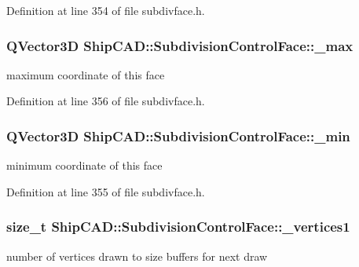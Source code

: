 Definition at line 354 of file subdivface.\+h.

\subsubsection[{\texorpdfstring{\+\_\+max}{_max}}]{\setlength{\rightskip}{0pt plus 5cm}Q\+Vector3D Ship\+C\+A\+D\+::\+Subdivision\+Control\+Face\+::\+\_\+max\hspace{0.3cm}{\ttfamily [protected]}}\hypertarget{classShipCAD_1_1SubdivisionControlFace_a22411574593283209772872bc740535b}{}\label{classShipCAD_1_1SubdivisionControlFace_a22411574593283209772872bc740535b}
maximum coordinate of this face 

Definition at line 356 of file subdivface.\+h.

\subsubsection[{\texorpdfstring{\+\_\+min}{_min}}]{\setlength{\rightskip}{0pt plus 5cm}Q\+Vector3D Ship\+C\+A\+D\+::\+Subdivision\+Control\+Face\+::\+\_\+min\hspace{0.3cm}{\ttfamily [protected]}}\hypertarget{classShipCAD_1_1SubdivisionControlFace_aac4f577da0f5203059901c5e09814e1d}{}\label{classShipCAD_1_1SubdivisionControlFace_aac4f577da0f5203059901c5e09814e1d}
minimum coordinate of this face 

Definition at line 355 of file subdivface.\+h.

\subsubsection[{\texorpdfstring{\+\_\+vertices1}{_vertices1}}]{\setlength{\rightskip}{0pt plus 5cm}size\+\_\+t Ship\+C\+A\+D\+::\+Subdivision\+Control\+Face\+::\+\_\+vertices1\hspace{0.3cm}{\ttfamily [protected]}}\hypertarget{classShipCAD_1_1SubdivisionControlFace_a5383fb638609da875d97457db86cd4df}{}\label{classShipCAD_1_1SubdivisionControlFace_a5383fb638609da875d97457db86cd4df}
number of vertices drawn to size buffers for next draw 

